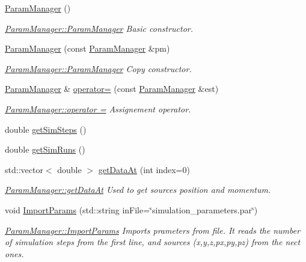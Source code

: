 \begin{DoxyCompactItemize}
\item 
\hyperlink{classParamManager_a2950d2af06c631b83e0d723765dcacfa}{Param\+Manager} ()
\begin{DoxyCompactList}\small\item\em \hyperlink{classParamManager_a2950d2af06c631b83e0d723765dcacfa}{Param\+Manager\+::\+Param\+Manager} Basic constructor. \end{DoxyCompactList}\item 
\hyperlink{classParamManager_a6f0dcb6c03fbacea1fdd78d1410ad776}{Param\+Manager} (const \hyperlink{classParamManager}{Param\+Manager} \&pm)
\begin{DoxyCompactList}\small\item\em \hyperlink{classParamManager_a2950d2af06c631b83e0d723765dcacfa}{Param\+Manager\+::\+Param\+Manager} Copy constructor. \end{DoxyCompactList}\item 
\hyperlink{classParamManager}{Param\+Manager} \& \hyperlink{classParamManager_ae4e63f59a1352a3602cb464ab24ef623}{operator=} (const \hyperlink{classParamManager}{Param\+Manager} \&est)
\begin{DoxyCompactList}\small\item\em \hyperlink{classParamManager_ae4e63f59a1352a3602cb464ab24ef623}{Param\+Manager\+::operator =} Assignement operator. \end{DoxyCompactList}\item 
double \hyperlink{classParamManager_ae58712c5696b4922b86048725b8c4501}{get\+Sim\+Steps} ()
\item 
double \hyperlink{classParamManager_ae02f327dc44c89493a8715f0d943b816}{get\+Sim\+Runs} ()
\item 
std\+::vector$<$ double $>$ \hyperlink{classParamManager_a9922b859162ad477b908c4251e90ca99}{get\+Data\+At} (int index=0)
\begin{DoxyCompactList}\small\item\em \hyperlink{classParamManager_a9922b859162ad477b908c4251e90ca99}{Param\+Manager\+::get\+Data\+At} Used to get source\textquotesingle{}s position and momentum. \end{DoxyCompactList}\item 
void \hyperlink{classParamManager_a8708a6a6ab26ceb69d856996f2f9085f}{Import\+Params} (std\+::string in\+File=\char`\"{}simulation\+\_\+parameters.\+par\char`\"{})
\begin{DoxyCompactList}\small\item\em \hyperlink{classParamManager_a8708a6a6ab26ceb69d856996f2f9085f}{Param\+Manager\+::\+Import\+Params} Imports prameters from file. It reads the number of simulation steps from the first line, and source\textquotesingle{}s (x,y,z,px,py,pz) from the nect ones. \end{DoxyCompactList}\item 

\end{DoxyCompactItemize}
